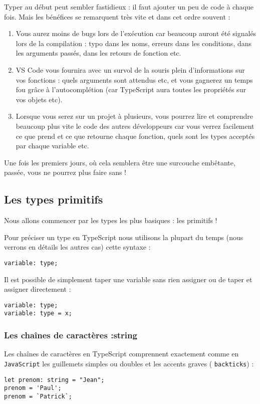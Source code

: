Typer au début peut sembler fastidieux : il faut ajouter un peu de code à chaque fois. Mais les bénéfices se remarquent très vite et dans cet ordre souvent :
\begin{enumerate}
\item  Vous aurez moins de bugs lors de l'exécution car beaucoup auront été signalés lors de la compilation : typo dans les noms, erreurs dans les conditions, dans les arguments passés, dans les retours de fonction etc.

\item   {\color{blue} VS} Code vous fournira avec un survol de la souris plein d'informations sur vos fonctions : quels arguments sont attendus etc, et vous gagnerez un temps fou grâce à l'autocomplétion (car  {\color{monOrange}TypeScript}  aura toutes les propriétés sur vos objets etc).

\item   Lorsque vous serez sur un projet à plusieurs, vous pourrez lire et comprendre beaucoup plus vite le code des autres développeurs car vous verrez facilement ce que prend et ce que retourne chaque fonction, quels sont les types acceptés par chaque variable etc.

\end{enumerate}
Une fois les premiers jours, où cela semblera être une surcouche embêtante, passée, vous ne pourrez plus faire sans !

\subsection{Les types primitifs}
Nous allons commencer par les types les plus basiques : les primitifs !

Pour préciser un type en  {\color{monOrange}TypeScript}  nous utilisons la plupart du temps (nous verrons en détails les autres cas) cette syntaxe :
\begin{verbatim}
variable: type;
\end{verbatim}

Il est possible de simplement taper une variable sans rien assigner ou de taper et assigner directement :
\begin{verbatim}
variable: type;
variable: type = x;
\end{verbatim}

\subsubsection{Les chaînes de caractères :string}
Les chaînes de caractères en {\color{monOrange}TypeScript}  comprennent exactement comme en {\tt JavaScript} les guillemets simples ou doubles et les accents graves ( {\tt backticks}) :
\begin{verbatim}
let prenom: string = "Jean";
prenom = 'Paul';
prenom = `Patrick`;
\end{verbatim}

